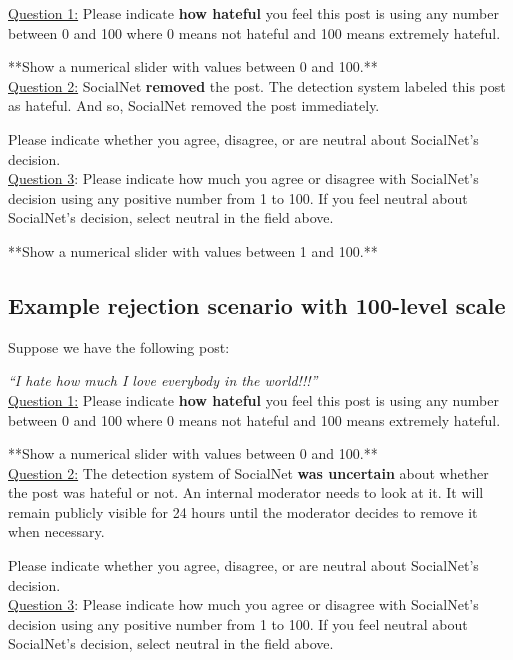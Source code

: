 \documentclass[a4paper]{article}
\begin{document}
\underline{Question 1:} Please indicate \textbf{how hateful} you feel this post is using any number between 0 and 100 where 0 means not hateful and 100 means extremely hateful.

**Show a numerical slider with values between 0 and 100.**\\

\underline{Question 2:} SocialNet \textbf{removed} the post. The detection system labeled this post as hateful. And so, SocialNet removed the post immediately.

Please indicate whether you agree, disagree, or are neutral about SocialNet’s decision.\\

\underline{Question 3}: Please indicate how much you agree or disagree with SocialNet’s decision using any positive number from 1 to 100. If you feel neutral about SocialNet’s decision, select neutral in the field above.

**Show a numerical slider with values between 1 and 100.**\\

\subsection{Example rejection scenario with 100-level scale}

Suppose we have the following post:

\textit{“I hate how much I love everybody in the world!!!”}\\

\underline{Question 1:} Please indicate \textbf{how hateful} you feel this post is using any number between 0 and 100 where 0 means not hateful and 100 means extremely hateful.

**Show a numerical slider with values between 0 and 100.**\\

\underline{Question 2:} The detection system of SocialNet \textbf{was uncertain} about whether the post was hateful or not. An internal moderator needs to look at it. It will remain publicly visible for 24 hours until the moderator decides to remove it when necessary.

Please indicate whether you agree, disagree, or are neutral about SocialNet’s decision.\\

\underline{Question 3}: Please indicate how much you agree or disagree with SocialNet’s decision using any positive number from 1 to 100. If you feel neutral about SocialNet’s decision, select neutral in the field above.
\end{document}
